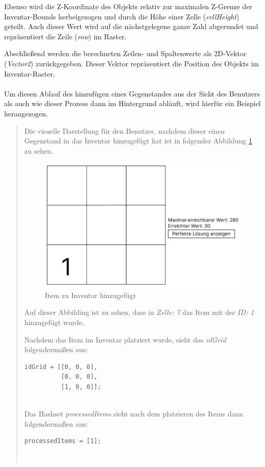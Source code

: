 Ebenso wird die Z-Koordinate des Objekts relativ zur maximalen Z-Grenze der Inventar-Bounds herbeigezogen und durch die
Höhe einer Zelle (\textit{cellHeight}) geteilt. Auch dieser Wert wird auf die nächstgelegene ganze Zahl abgerundet und
repräsentiert die Zeile (\textit{row}) im Raster.

Abschließend werden die berechneten Zeilen- und Spaltenwerte als 2D-Vektor (\textit{Vector2}) zurückgegeben. Dieser
Vektor repräsentiert die Position des Objekts im Inventar-Raster.\\
\\
Um diesen Ablauf des hinzufügen eines Gegenstandes aus der Sicht des Benutzers als auch wie dieser Prozess dann im
Hintergrund abläuft, wird hierfür ein Beispiel herangezogen.

\begin{quote}
Die visuelle Darstellung für den Benutzer, nachdem dieser einen Gegenstand in das Inventar hinzugefügt hat ist in folgender
Abbildung \ref{fig:controller_itemAdded} zu sehen.

\begin{figure}[H]
    \centering
    \includegraphics[scale=0.6]{images/itemAdded}
    \caption{Item zu Inventar hinzugefügt}
    \label{fig:controller_itemAdded}
\end{figure}

Auf dieser Abbilding ist zu sehen, dass in \textit{Zelle: 7} das Item mit der \textit{ID: 1} hinzugefügt wurde.

Nachdem das Item im Inventar platziert wurde, sieht das \textit{idGrid} folgendermaßen aus:
\begin{lstlisting}[style=csharp label=code:controller_savedID]
idGrid = [[0, 0, 0],
          [0, 0, 0],
          [1, 0, 0]];
\end{lstlisting}\\

Das Hashset \textit{processedItems} sieht nach dem platzieren des Items dann folgendermaßen aus:
\begin{lstlisting}[style=csharp label=code:controller_savedID]
processedItems = [1];
\end{lstlisting}\\
\end{quote}
